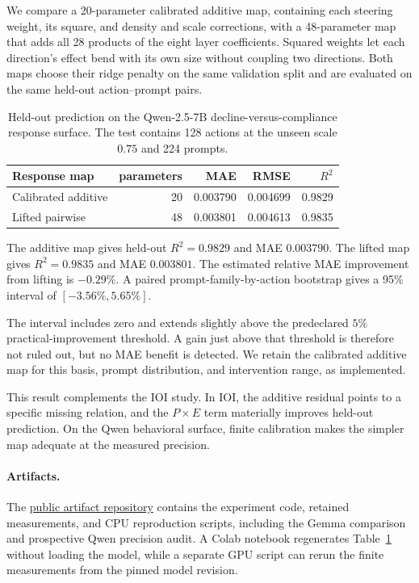 \documentclass[sigconf,10pt,nonacm,balance=false]{acmart}
\begin{document}
We compare a 20-parameter calibrated additive map, containing each steering weight, its square, and density and scale corrections, with a 48-parameter map that adds all 28 products of the eight layer coefficients. Squared weights let each direction's effect bend with its own size without coupling two directions. Both maps choose their ridge penalty on the same validation split and are evaluated on the same held-out action--prompt pairs.

\begin{table}[t]
\centering
\caption{Held-out prediction on the Qwen-2.5-7B decline-versus-compliance response surface. The test contains 128 actions at the unseen scale $0.75$ and 224 prompts.}
\label{tab:qwen}
\scriptsize
\setlength{\tabcolsep}{5pt}
\begin{tabular}{lrrrr}
\toprule
Response map & parameters & MAE & RMSE & $R^2$ \\
\midrule
Calibrated additive & 20 & 0.003790 & 0.004699 & 0.9829 \\
Lifted pairwise & 48 & 0.003801 & 0.004613 & 0.9835 \\
\bottomrule
\end{tabular}
\end{table}

The additive map gives held-out $R^2=0.9829$ and MAE $0.003790$. The lifted map gives $R^2=0.9835$ and MAE $0.003801$. The estimated relative MAE improvement from lifting is $-0.29\%$. A paired prompt-family-by-action bootstrap gives a 95\% interval of $[-3.56\%,5.65\%]$.

The interval includes zero and extends slightly above the predeclared $5\%$ practical-improvement threshold. A gain just above that threshold is therefore not ruled out, but no MAE benefit is detected. We retain the calibrated additive map for this basis, prompt distribution, and intervention range, as implemented.

This result complements the IOI study. In IOI, the additive residual points to a specific missing relation, and the $P\times E$ term materially improves held-out prediction. On the Qwen behavioral surface, finite calibration makes the simpler map adequate at the measured precision.

\paragraph{Artifacts.}
The \href{https://github.com/kwisatzh/mechanistic-tomography}{public artifact repository} contains the experiment code, retained measurements, and CPU reproduction scripts, including the Gemma comparison and prospective Qwen precision audit. A Colab notebook regenerates Table~\ref{tab:qwen} without loading the model, while a separate GPU script can rerun the finite measurements from the pinned model revision.
\end{document}
